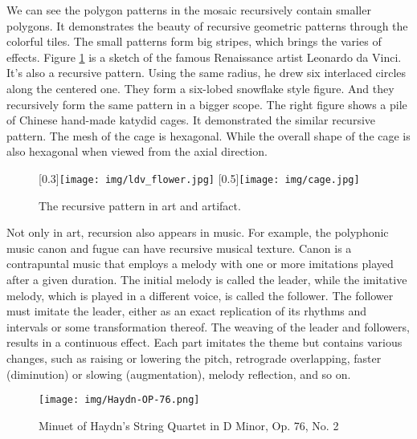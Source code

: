 \documentclass{article}
\begin{document}
We can see the polygon patterns in the mosaic recursively contain smaller polygons. It demonstrates the beauty of recursive geometric patterns through the colorful tiles. The small patterns form big stripes, which brings the varies of effects. Figure \ref{fig:flower} is a sketch of the famous Renaissance artist Leonardo da Vinci. It's also a recursive pattern. Using the same radius, he drew six interlaced circles along the centered one. They form a six-lobed snowflake style figure. And they recursively form the same pattern in a bigger scope. The right figure shows a pile of Chinese hand-made katydid cages. It demonstrated the similar recursive pattern. The mesh of the cage is hexagonal. While the overall shape of the cage is also hexagonal when viewed from the axial direction.

\begin{figure}[htbp]
 \centering
 [0.3\linewidth]{\texttt{[image: img/ldv\_flower.jpg]}} \quad
 [0.5\linewidth]{\texttt{[image: img/cage.jpg]}}
 \caption{The recursive pattern in art and artifact.}
 \label{fig:flower}
\end{figure}

Not only in art, recursion also appears in music. For example, the polyphonic music canon and fugue can have recursive musical texture. Canon is a contrapuntal music that employs a melody with one or more imitations played after a given duration. The initial melody is called the leader, while the imitative melody, which is played in a different voice, is called the follower. The follower must imitate the leader, either as an exact replication of its rhythms and intervals or some transformation thereof. The weaving of the leader and followers, results in a continuous effect. Each part imitates the theme but contains various changes, such as raising or lowering the pitch, retrograde overlapping, faster (diminution) or slowing (augmentation), melody reflection, and so on.

\begin{figure}[htbp]
 \centering
 \texttt{[image: img/Haydn-OP-76.png]}
 \caption{Minuet of Haydn's String Quartet in D Minor, Op. 76, No. 2}
 \label{fig:Haydn-OP-76}
\end{figure}
\end{document}
